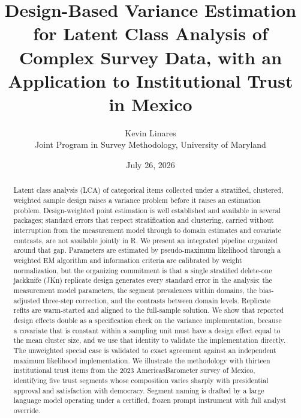 \documentclass[
  12pt]{article}
\begin{document}
\def\spacingset#1{\renewcommand{\baselinestretch}%
{#1}\small\normalsize} \spacingset{1}



\date{July 26, 2026}
\title{\bf Design-Based Variance Estimation for Latent Class Analysis of
Complex Survey Data, with an Application to Institutional Trust in
Mexico}
\author{
Kevin Linares\\
Joint Program in Survey Methodology, University of Maryland\\
}
\maketitle

\bigskip
\bigskip
\begin{abstract}
Latent class analysis (LCA) of categorical items collected under a
stratified, clustered, weighted sample design raises a variance problem
before it raises an estimation problem. Design-weighted point estimation
is well established and available in several packages; standard errors
that respect stratification and clustering, carried without interruption
from the measurement model through to domain estimates and covariate
contrasts, are not available jointly in R. We present an integrated
pipeline organized around that gap. Parameters are estimated by
pseudo-maximum likelihood through a weighted EM algorithm and
information criteria are calibrated by weight normalization, but the
organizing commitment is that a single stratified delete-one jackknife
(JKn) replicate design generates every standard error in the analysis:
the measurement model parameters, the segment prevalences within
domains, the bias-adjusted three-step correction, and the contrasts
between domain levels. Replicate refits are warm-started and aligned to
the full-sample solution. We show that reported design effects double as
a specification check on the variance implementation, because a
covariate that is constant within a sampling unit must have a design
effect equal to the mean cluster size, and we use that identity to
validate the implementation directly. The unweighted special case is
validated to exact agreement against an independent maximum likelihood
implementation. We illustrate the methodology with thirteen
institutional trust items from the 2023 AmericasBarometer survey of
Mexico, identifying five trust segments whose composition varies sharply
with presidential approval and satisfaction with democracy. Segment
naming is drafted by a large language model operating under a certified,
frozen prompt instrument with full analyst override.
\end{abstract}
\end{document}
